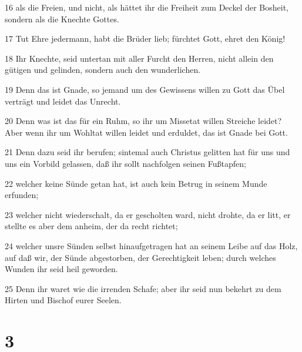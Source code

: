 \par 16 als die Freien, und nicht, als hättet ihr die Freiheit zum Deckel der Bosheit, sondern als die Knechte Gottes.
\par 17 Tut Ehre jedermann, habt die Brüder lieb; fürchtet Gott, ehret den König!
\par 18 Ihr Knechte, seid untertan mit aller Furcht den Herren, nicht allein den gütigen und gelinden, sondern auch den wunderlichen.
\par 19 Denn das ist Gnade, so jemand um des Gewissens willen zu Gott das Übel verträgt und leidet das Unrecht.
\par 20 Denn was ist das für ein Ruhm, so ihr um Missetat willen Streiche leidet? Aber wenn ihr um Wohltat willen leidet und erduldet, das ist Gnade bei Gott.
\par 21 Denn dazu seid ihr berufen; sintemal auch Christus gelitten hat für uns und uns ein Vorbild gelassen, daß ihr sollt nachfolgen seinen Fußtapfen;
\par 22 welcher keine Sünde getan hat, ist auch kein Betrug in seinem Munde erfunden;
\par 23 welcher nicht wiederschalt, da er gescholten ward, nicht drohte, da er litt, er stellte es aber dem anheim, der da recht richtet;
\par 24 welcher unsre Sünden selbst hinaufgetragen hat an seinem Leibe auf das Holz, auf daß wir, der Sünde abgestorben, der Gerechtigkeit leben; durch welches Wunden ihr seid heil geworden.
\par 25 Denn ihr waret wie die irrenden Schafe; aber ihr seid nun bekehrt zu dem Hirten und Bischof eurer Seelen.

\chapter{3}

